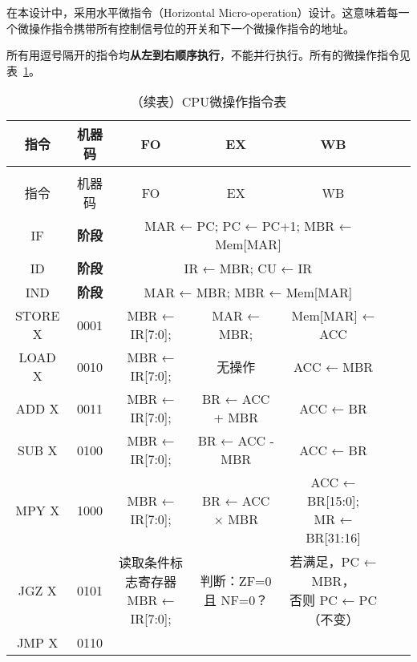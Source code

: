 \documentclass[lang=cn,a4paper,newtx]{elegantpaper}
\begin{document}
在本设计中，采用水平微指令（Horizontal Micro-operation）设计。这意味着每一个微操作指令携带所有控制信号位的开关和下一个微操作指令的地址。

所有用逗号隔开的指令均\textbf{从左到右顺序执行}，不能并行执行。所有的微操作指令见表~\ref{tab:five_stage_pipeline}。

\begin{longtable}{ccccccl}
  \caption{CPU微操作指令表} \label{tab:five_stage_pipeline}\\
  \toprule
  指令 & 机器码 &  FO & EX & WB \\
  \midrule
  \endfirsthead

  \toprule
  \caption[]{（续表）CPU微操作指令表} \\
  \toprule
  指令 & 机器码 & FO & EX & WB \\
  \midrule
  \endhead

  \bottomrule
  \endlastfoot
  \rowcolor{red!10}
  IF & \textbf{阶段} & \multicolumn{3}{c}{MAR ← PC; PC ← PC+1; MBR ← Mem[MAR]} \\
  \midrule
  \rowcolor{yellow!10}
  ID & \textbf{阶段} & \multicolumn{3}{c}{IR ← MBR;  CU ← IR}\\
  \midrule
  \rowcolor{green!10}
  IND & \textbf{阶段} & \multicolumn{3}{c}{MAR ← MBR;  MBR ← Mem[MAR]}\\
  \midrule
  STORE X & 0001 &MBR ← IR[7:0];  & MAR ← MBR; & Mem[MAR] ← ACC \\

  LOAD X & 0010 &
  MBR ← IR[7:0];  & 
  无操作 & 
  ACC ← MBR \\
  \midrule
  ADD X & 0011 &
  
  MBR ← IR[7:0];  &
  BR ← ACC + MBR & 
  ACC ← BR \\

  SUB X & 0100 &
  
  MBR ← IR[7:0]; &
  BR ← ACC - MBR & 
  ACC ← BR \\
  MPY X & 1000 &
  
  MBR ← IR[7:0]; &
  BR ← ACC × MBR &
  \makecell{ACC ← BR[15:0];\\ MR ← BR[31:16]} \\
  \midrule
  JGZ X & 0101 &
  
  \makecell{读取条件标志寄存器\\MBR ← IR[7:0];}  & 
  判断：ZF=0 且 NF=0？ & 
  \makecell{若满足，PC ← MBR，\\否则 PC ← PC（不变）} \\

  JMP X & 0110 &
  

\end{longtable}
\end{document}
